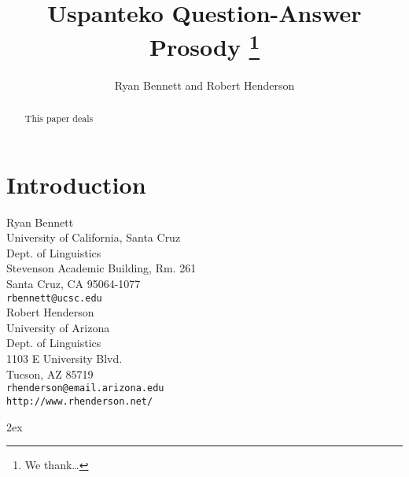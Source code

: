 \documentclass[12pt]{article}
\title{Uspanteko Question-Answer Prosody
\thanks{We thank\ldots}
}
\author{Ryan Bennett and Robert Henderson}
\date{}
\newcommand{\nrm}[1]{\textnormal{#1}}
\begin{document}
\RaggedRight
\maketitle
\setcounter{endnote}{0} %
\renewcommand{\theendnote}{\arabic{endnote}} %
\begin{abstract}
\noindent
This paper deals 
\end{abstract}




\newcommand{\scat}{{\sc SubCat}}
\newcommand{\wmin}{{\omega\nrm{\scriptsize\sc -Min}}}
\newcommand{\wmax}{{\omega\nrm{\scriptsize\sc -Max}}}
\newcommand{\wnonmin}{{\omega\nrm{\scriptsize\sc -NonMin}}}
\newcommand{\wnonmax}{{\omega\nrm{\scriptsize\sc -NonMax}}}

\section{Introduction}
\label{introduction}


\newpage
\noindent
Ryan Bennett\\
University of California, Santa Cruz\\
Dept. of Linguistics\\
Stevenson Academic Building, Rm. 261\\
Santa Cruz, CA 95064-1077\\
\texttt{rbennett@ucsc.edu}\\


\noindent
Robert Henderson\\
University of Arizona\\
Dept. of Linguistics\\
1103 E University Blvd.\\
Tucson, AZ 85719\\
\texttt{rhenderson@email.arizona.edu}\\
\texttt{http://www.rhenderson.net/}


\newpage
\begingroup
\parindent 0pt
\parskip 2ex
\def\enotesize{\normalsize}
\theendnotes
\endgroup
\end{document}
